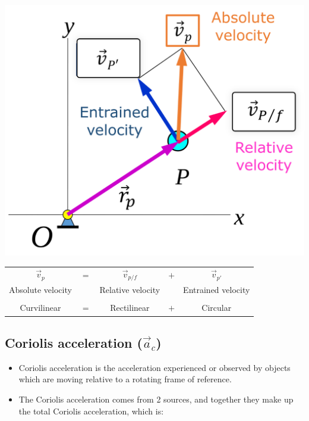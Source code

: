 \documentclass[11pt]{article}
\begin{document}
\begin{center}
\includegraphics[width=.9\linewidth]{./images/different-types-of-velocities-in-curvilinear-motion.png}
\end{center}

\begin{center}
\begin{tabular}{c c c c c}
\(\vec{v}_p\) & \(=\) & \(\vec{v}_{p/f}\) & \(+\) & \(\vec{v}_{p'}\)\\[0pt]
Absolute velocity &  & Relative velocity &  & Entrained velocity\\[0pt]
 &  &  &  & \\[0pt]
Curvilinear & \(=\) & Rectilinear & \(+\) & Circular\\[0pt]
\end{tabular}
\end{center}

 \newpage

\subsection{Coriolis acceleration (\(\vec{a}_c\))}
\label{sec:org6728773}
\begin{itemize}
\item Coriolis acceleration is the acceleration experienced or observed by objects which are moving relative to a rotating frame of reference.
\item The Coriolis acceleration comes from 2 sources, and together they make up the total Coriolis acceleration, which is:
\end{itemize}
\end{document}
